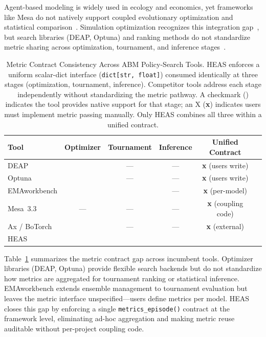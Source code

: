 \documentclass{wscpaperproc}
\newcommand{\cmark}{\ding{51}}
\begin{document}
Agent-based modeling is widely used in ecology and economics, yet frameworks
like Mesa do not natively support coupled evolutionary optimization and
statistical comparison~\cite{kazil2020mesa}. Simulation optimization recognizes
this integration gap~\cite{fu2002optimization}, but search libraries (DEAP,
Optuna) and ranking methods do not standardize metric sharing across
optimization, tournament, and inference stages~\cite{fortin2012deap,akiba2019optuna}.


\begin{table}[ht]
\centering\small
\caption{Metric Contract Consistency Across ABM Policy-Search Tools.
HEAS enforces a uniform scalar-dict interface (\texttt{dict[str, float]})
consumed identically at three stages (optimization, tournament, inference).
Competitor tools address each stage independently without standardizing
the metric pathway. A checkmark (\cmark) indicates the tool provides
native support for that stage; an X (\textbf{x}) indicates users must implement
metric passing manually. Only HEAS combines all three within a unified contract.}
\label{tab:contracts}
\begin{tabular}{lccccc}
\toprule
Tool & Optimizer & Tournament & Inference & Unified Contract \\
\midrule
DEAP & \cmark & --- & --- & \textbf{x} (users write) \\
Optuna & \cmark & --- & --- & \textbf{x} (users write) \\
EMAworkbench & \cmark & \cmark & --- & \textbf{x} (per-model) \\
Mesa~3.3 & --- & --- & --- & \textbf{x} (coupling code) \\
Ax / BoTorch & \cmark & --- & --- & \textbf{x} (external) \\
HEAS & \cmark & \cmark & \cmark & \cmark \\
\bottomrule
\end{tabular}
\end{table}

Table~\ref{tab:contracts} summarizes the metric contract gap across incumbent tools.
Optimizer libraries (DEAP, Optuna) provide flexible search backends but do not
standardize how metrics are aggregated for tournament ranking or statistical inference.
EMAworkbench extends ensemble management to tournament evaluation but leaves the metric
interface unspecified---users define metrics per model. HEAS closes this gap by enforcing
a single \texttt{metrics\_episode()} contract at the framework level, eliminating
ad-hoc aggregation and making metric reuse auditable without per-project coupling code.
\end{document}
